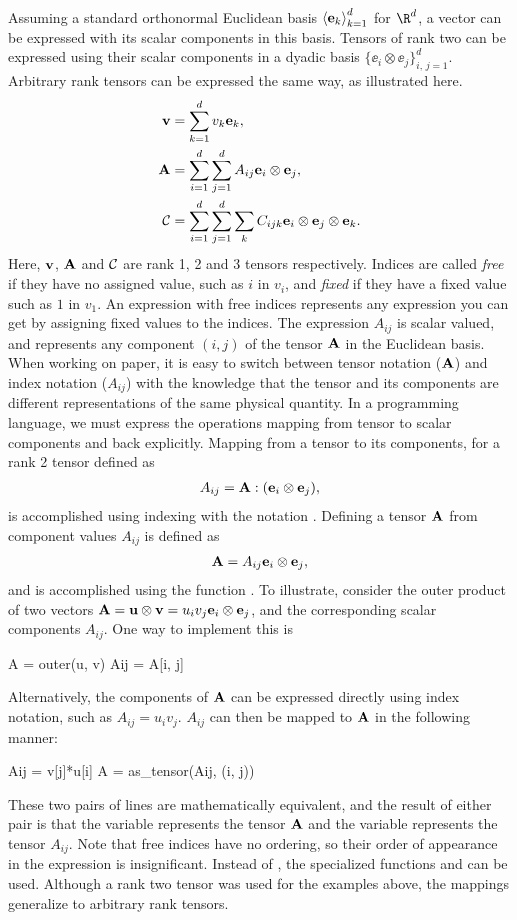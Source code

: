 Assuming a standard orthonormal Euclidean basis
$\seq{\ee_k}_{k=1}^d$ for $\R^d$, a vector can
be expressed with its scalar components in this basis.
Tensors of rank two can be expressed using
their scalar components in a dyadic basis
$\{ \ee_i\otimes\ee_j \}_{i,\,j=1}^d$.
Arbitrary rank tensors can be expressed
the same way, as illustrated here.
\begin{align}
\vv &= \sum_{k=1}^{d} v_k \ee_k, \\
\AA &= \sum_{i=1}^{d} \sum_{j=1}^{d} A_{ij} \ee_i \otimes \ee_j, \\
\Cc &= \sum_{i=1}^{d} \sum_{j=1}^{d} \sum_k C_{ijk} \ee_i \otimes \ee_j \otimes \ee_k.
\end{align}
Here, $\vv$, $\AA$ and $\Cc$ are rank 1, 2 and 3 tensors respectively.
Indices are called \emph{free} if they have no assigned value, such as
$i$ in $v_i$, and \emph{fixed} if they have a fixed value such as $1$
in $v_1$. An expression with free indices represents any expression
you can get by assigning fixed values to the indices.  The expression
$A_{ij}$ is scalar valued, and represents any component $(i,j)$ of the
tensor $\AA$ in the Euclidean basis.  When working on paper, it is
easy to switch between tensor notation ($\AA$) and index notation
($A_{ij}$) with the knowledge that the tensor and its components are
different representations of the same physical quantity.  In a
programming language, we must express the operations mapping from
tensor to scalar components and back explicitly.  Mapping from a
tensor to its components, for a rank 2 tensor defined as
\begin{align}
A_{ij} = \AA : (\ee_i\otimes\ee_j), \\
\end{align}
is accomplished using indexing with the notation .
Defining a tensor $\AA$ from component values $A_{ij}$
is defined as
\begin{align}
\AA = A_{ij} \ee_i\otimes\ee_j,
\end{align}
and is accomplished using the function .
To illustrate, consider the outer product of two
vectors $\AA = \uu\otimes\vv = u_i v_j \ee_i\otimes\ee_j$,
and the corresponding scalar components $A_{ij}$.
One way to implement this is
\begin{python}
A = outer(u, v)
Aij = A[i, j]
\end{python}
Alternatively, the components of $\AA$ can be expressed directly using
index notation, such as $A_{ij} = u_i v_j$.  $A_{ij}$ can then be
mapped to $\AA$ in the following manner:
\begin{python}
Aij = v[j]*u[i]
A = as_tensor(Aij, (i, j))
\end{python}
These two pairs of lines are mathematically equivalent, and the result
of either pair is that the variable  represents the tensor
$\AA$ and the variable  represents the tensor $A_{ij}$.
Note that free indices have no ordering, so their order of appearance
in the expression  is insignificant.  Instead of
, the specialized functions  and
 can be used.  Although a rank two tensor was used
for the examples above, the mappings generalize to arbitrary rank
tensors.

